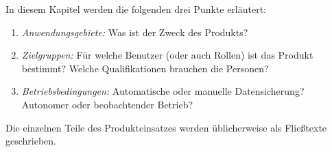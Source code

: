 \begin{tcolorbox}
In diesem Kapitel werden die folgenden drei Punkte erläutert:
\begin{enumerate}
	\item \textit{Anwendungsgebiete:} Was ist der Zweck des Produkts?
	\item \textit{Zielgruppen:} Für welche Benutzer (oder auch Rollen) ist das Produkt bestimmt?
	Welche Qualifikationen brauchen die Personen?
	\item \textit{Betriebsbedingungen:} Automatische oder manuelle Datensicherung? 	Autonomer oder beobachtender Betrieb? 	
\end{enumerate}

\noindent Die einzelnen Teile des Produkteinsatzes werden üblicherweise als Fließtexte geschrieben.
\end{tcolorbox}
